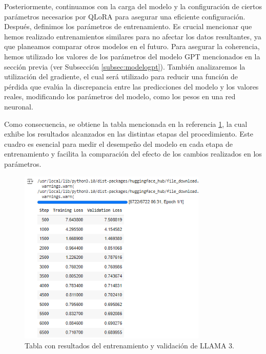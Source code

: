 \bigskip %

Posteriormente, continuamos con la carga del modelo y la configuración de ciertos parámetros necesarios por QLoRA para asegurar una eficiente configuración. Después, definimos los parámetros de entrenamiento. Es crucial mencionar que hemos realizado entrenamientos similares para no afectar los datos resultantes, ya que planeamos comparar otros modelos en el futuro. Para asegurar la coherencia, hemos utilizado los valores de los parámetros del modelo \acrshort{GPT} mencionados en la sección previa (ver Subsección \ref{subsec:modelogpt}). También analizaremos la utilización del gradiente, el cual será utilizado para reducir una función de pérdida que evalúa la discrepancia entre las predicciones del modelo y los valores reales, modificando los parámetros del modelo, como los pesos en una red neuronal.

\bigskip %

Como consecuencia, se obtiene la tabla mencionada en la referencia \ref{fig:5_LLAMA_TablaSteps.png}, la cual exhibe los resultados alcanzados en las distintas etapas del procedimiento. Este cuadro es esencial para medir el desempeño del modelo en cada etapa de entrenamiento y facilita la comparación del efecto de los cambios realizados en los parámetros.


\clearpage  %

\begin{figure}[htbp!]
  \centering
\includegraphics[width=0.8\textwidth,keepaspectratio]{imaxes/5_LLAMA_TablaSteps.png}
  \caption{Tabla con resultados del entrenamiento y validación de LLAMA 3.}
  \label{fig:5_LLAMA_TablaSteps.png}
\end{figure}

